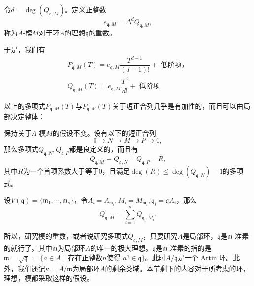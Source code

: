 \begin{definition}
令$d = \deg(Q_{\mathfrak{q},M})$。定义正整数
\begin{equation} \label{eq: multiplicity of a module}
e_{\mathfrak{q},M} = \Delta^d Q_{\mathfrak{q},M},
\end{equation}
称为$A$-模$M$对于环$A$的理想$\mathfrak{q}$的重数。
\end{definition}
于是，我们有
\begin{gather}
P_{\mathfrak{q},M}(T) = e_{\mathfrak{q},M}\dfrac{T^{d-1}}{(d-1)!} + \text{ 低阶项，} \\
Q_{\mathfrak{q},M}(T) = e_{\mathfrak{q},M}\dfrac{T^{d}}{d!} + \text{ 低阶项}
\end{gather}

以上的多项式$P_{\mathfrak{q},M}(T)$与$P_{\mathfrak{q},M}(T)$关于短正合列几乎是有加性的，而且可以由局部决定整体：
\begin{proposition}
\label{almost additivity of hilbert polyn}
保持关于$A$-模$M$的假设不变。设有以下的短正合列
$$0\longrightarrow N \longrightarrow M\longrightarrow P \longrightarrow 0,$$
那么多项式$Q_{\mathfrak{q},N}, Q_{\mathfrak{q},P}$都是良定义的，而且有
\begin{equation}
Q_{\mathfrak{q},M} = Q_{\mathfrak{q},N} + Q_{\mathfrak{q},P} - R,
\end{equation}
其中$R$为一个首项系数大于等于$0$，且满足$\deg(R) \leqslant \deg(Q_{\mathfrak{q},N}) - 1$的多项式。
\end{proposition}

\begin{proposition}
\label{local multiplicity to global}
设$V(\mathfrak{q}) = \{\mathfrak{m}_1, \cdots, \mathfrak{m}_s\}$，令$A_i = A_{\mathfrak{m}_i}, M_i = M_{\mathfrak{m}_i}, \mathfrak{q}_i = \mathfrak{q}A_i$，那么
\begin{equation}
Q_{\mathfrak{q},M} = \sum\limits_{i=1}^s Q_{\mathfrak{q}_i,M_i}.
\end{equation}
\end{proposition}

所以，研究模的重数，或者说研究多项式$Q_{\mathfrak{q},M}$，只要研究$A$是局部环，$\mathfrak{q}$是$\mathfrak{m}$-准素的就行了。其中$\mathfrak{m}$为局部环$A$的唯一的极大理想。$\mathfrak{q}$是$\mathfrak{m}$-准素的指的是$\mathfrak{m} = \sqrt{\mathfrak{q}} := \{ a \in A \ |\ \text{ 存在正整数$n$使得 } a^n\in \mathfrak{q} \}$。此时$A/\mathfrak{q}$是一个 Artin 环。此外，我们还记$\kappa = A / \mathfrak{m}$为局部环$A$的剩余类域。本节剩下的内容对于所考虑的环，理想，模都采取这样的假设。

